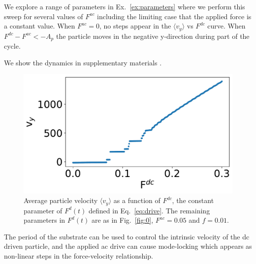 \documentclass[twocolumn,preprintnumbers,amsmath,amssymb,aps,prx]{revtex4}
\begin{document}
We explore a range of parameters in Ex.~\ref{ex:parameters}
where 
we perform this sweep for several values
of $F^{ac}$ including the limiting case that the applied force
is a constant value.
When $F^{ac} = 0$, no steps appear
in the $\langle v_y \rangle $ vs $F^{dc}$ curve. 
When $F^{dc} - F^{ac} < -A_p$ the particle
moves in the negative y-direction 
during part of the cycle.

We 
show the dynamics 
in supplementary materials \cite{supp1}.

\begin{center}
\begin{figure}[h!]
\centering
\includegraphics[width=\columnwidth]{sweep_FDC_vs_vx.pdf}
\caption{Average particle velocity  $\langle v_{y} \rangle$ as a function of $F^{dc}$,
  the constant parameter of $F^d(t)$ defined in Eq.~\ref{eq:drive}.
  The remaining parameters in $F^d(t)$ are as in Fig.~\ref{fig:0}, $F^{ac}=0.05$ and $f = 0.01$.}
\label{fig:1}
\end{figure}
\end{center}


The period of the substrate
can be used to control the
intrinsic velocity of the dc driven particle,
and the applied ac drive can cause mode-locking
which appears as non-linear 
steps in the force-velocity relationship.
\end{document}
